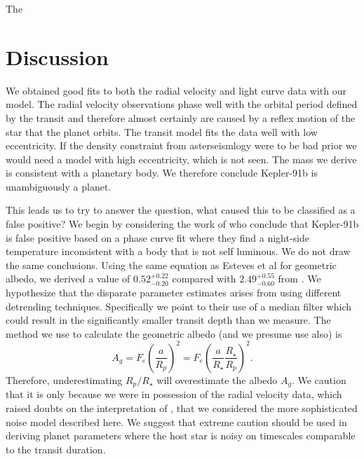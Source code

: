 \documentclass[apjl]{emulateapj}
\begin{document}
The

\section{Discussion}
We obtained good fits to both the radial velocity and light curve data with our model. The radial velocity observations phase well with the orbital period defined by the transit and therefore almost certainly are caused by a reflex motion of the star that the planet orbits. The transit model fits the data well with low eccentricity. If the density constraint from asterseismlogy were to be bad prior we would need a model with high eccentricity, which is not seen. The mass we derive is consistent with a planetary body. We therefore conclude Kepler-91b is unambiguously a planet.

This leads us to try to answer the question, what caused this to be classified as a false positive? We begin by considering the work of \citet{esteves13} who conclude that Kepler-91b is false positive based on a phase curve fit where they find a night-side temperature inconsistent with a body that is not self luminous. We do not draw the same conclusions. Using the same equation as Esteves et al for geometric albedo, we derived a value of $0.52^{+0.22}_{-0.20}$ compared with $2.49^{+0.55}_{-0.60}$ from \citeauthor{esteves13}. We hypothesize that the disparate parameter estimates arises from using different detrending techniques. Specifically we point to their use of a median filter which could result in the significantly smaller transit depth than we measure. The method we use to calculate the geometric albedo (and we presume \citeauthor{esteves13} use also) is
\begin{equation}
A_g = F_e \left(\frac{a}{R_p}\right)^{2} = F_e \left(\frac{a}{R_{\star}}\frac{R_{\star}}{R_{p}}\right)^{2} .
\end{equation}
Therefore, underestimating $R_{p}/R_{\star}$ will overestimate the albedo $A_g$. We caution that it is only because we were in possession of the radial velocity data, which raised doubts on the interpretation of \citeauthor{esteves13}, that we considered the more sophisticated noise model described here. We suggest that extreme caution should be used in deriving planet parameters where the host star is noisy on timescales comparable to the transit duration.
\end{document}
